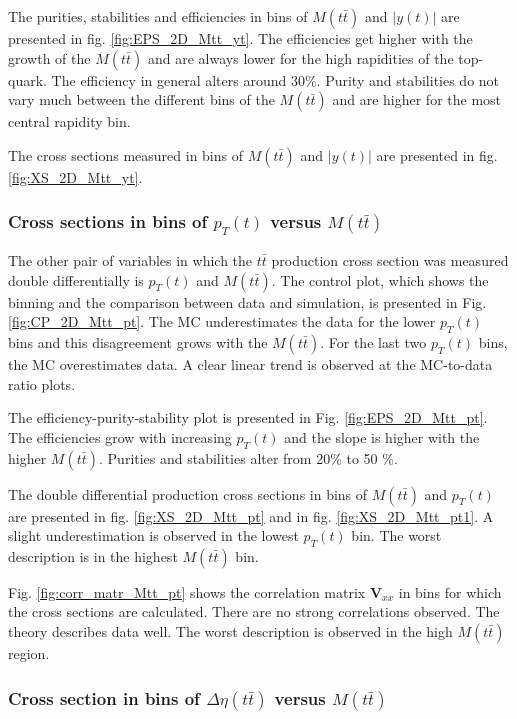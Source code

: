 The purities, stabilities and efficiencies in bins of $M(t\bar{t})$ and $|y(t)|$ are presented in fig. \ref{fig:EPS_2D_Mtt_yt}. The efficiencies get higher with the 
growth of the $M(t\bar{t})$ and are always lower for the high rapidities of the top-quark. The efficiency in general alters around 30\%. Purity and stabilities
do not vary much between the different bins of the $M(t\bar{t})$ and are higher for the most central rapidity bin. 

The cross sections measured in bins of $M(t\bar{t})$ and $|y(t)|$ are presented in fig. \ref{fig:XS_2D_Mtt_yt}.


\subsubsection{Cross sections in bins of $p_{T}(t)$ versus $M(t\bar{t})$}

The other pair of variables in which the $t\bar{t}$ production cross section was measured double differentially is $p_{T}(t)$ and $M(t\bar{t})$.
The control plot, which shows the binning and the comparison between data and simulation, is presented in Fig. \ref{fig:CP_2D_Mtt_pt}. The MC underestimates 
the data for the lower $p_{T}(t)$ bins and this disagreement grows with the $M(t\bar{t})$. For the last two $p_{T}(t)$ bins, the MC overestimates data. A clear
linear trend is observed at the MC-to-data ratio plots.

The efficiency-purity-stability plot is presented in Fig. \ref{fig:EPS_2D_Mtt_pt}. The efficiencies grow with increasing $p_{T}(t)$ and the slope is higher with
the higher $M(t\bar{t})$. Purities and stabilities alter from 20\% to 50 \%.

The double differential production cross sections in bins of $M(t\bar{t})$ and $p_{T}(t)$ are presented in fig. \ref{fig:XS_2D_Mtt_pt} and in fig. \ref{fig:XS_2D_Mtt_pt1}. A slight underestimation is 
observed in the lowest $p_{T}(t)$ bin. The worst description is in the highest $M(t\bar{t})$ bin.

Fig. \ref{fig:corr_matr_Mtt_pt} shows the correlation matrix $\mathbf{V}_{xx}$ in bins for which the cross sections are calculated. There are no strong correlations
observed. The theory describes data well. The worst description is observed in the high $M(t\bar{t})$ region.

\subsubsection{Cross section in bins of $\Delta\eta(t\bar{t})$ versus $M(t\bar{t})$}

